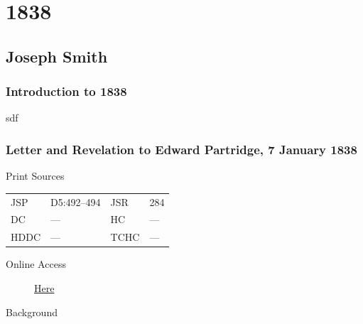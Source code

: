 \section{1838}

	\subsection{Joseph Smith}
		\label{EMS-1838-JS}

		\subsubsection{Introduction to 1838}
		
			sdf
			
		\subsubsection{Letter and Revelation to Edward Partridge, 7 January 1838}
			\label{EMS-1838-JS-7-JAN-1838}
			
			\begin{description}
					\item[Print Sources]
				\end{description}

					\begin{tabular}{p{0.5in}p{1in}p{0.5in}p{1in}}
					JSP	 	& D5:492--494		& JSR 		& 284 \\
					DC	 	& ---		& HC 		& --- \\
					HDDC 	& ---		& TCHC 		& --- \\
					\end{tabular}
				
				\begin{description}
					\item[Online Access] \href{https://www.josephsmithpapers.org/paper-summary/letter-and-revelation-to-edward-partridge-7-january-1838/1}{Here}
				\end{description}
				
				\begin{description}
					\item[Background]
				\end{description}
				
